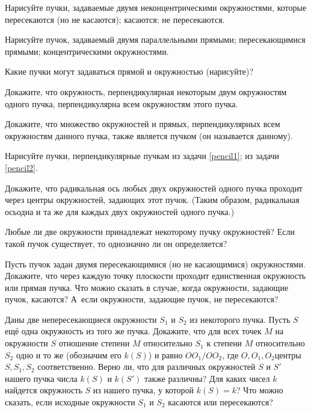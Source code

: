 \documentclass[a4paper,12pt]{article}
\begin{document}
\label{pencil1}
Нарисуйте пучки, задаваемые двумя неконцентрическими окружностями, которые\\
 пересекаются (но не касаются);
 касаются;
 не пересекаются.

\label{pencil2}
Нарисуйте пучок, задаваемый двумя
 параллельными прямыми;
 пересекающимися прямыми;
 концентрическими окружностями.

Какие пучки могут задаваться прямой и окружностью (нарисуйте)?

Докажите, что окружность, перпендикулярная некоторым двум окружностям одного пучка, перпендикулярна всем окружностям этого пучка.

Докажите, что множество окружностей и прямых, перпендикулярных всем окружностям данного пучка, также является пучком (он называется  данному).

Нарисуйте пучки, перпендикулярные пучкам
 из задачи \ref{pencil1};
 из задачи \ref{pencil2}.

Докажите, что радикальная ось любых двух окружностей одного пучка проходит через центры окружностей, задающих этот пучок. (Таким образом, радикальная ось\т одна и та же для каждых двух окружностей одного пучка.)

\vfill
{}
\newpage

Любые ли две окружности принадлежат некоторому пучку окружностей?
Если такой пучок существует, то однозначно ли он определяется?



Пусть пучок задан двумя пересекающимися (но не касающимися) окружностями. Докажите, что через каждую точку плоскости проходит единственная окружность или прямая пучка.
Что можно сказать в случае, когда окружности, задающие пучок, касаются?
А~если окружности, задающие пучок, не пересекаются?

Даны две непересекающиеся окружности $S_1$ и $S_2$ из некоторого пучка. Пусть $S$\т ещё одна окружность из того же пучка. Докажите, что для всех точек $M$ на окружности $S$ отношение степени $M$ относительно $S_1$ к степени $M$ относительно $S_2$ одно и то же (обозначим его $k(S)$) и равно $OO_1/OO_2$, где $O,O_1,O_2$\т центры $S,S_1,S_2$ соответственно.
Верно ли, что для различных окружностей $S$ и $S'$ нашего пучка числа $k(S)$ и $k(S')$ также различны?
Для каких чисел $k$ найдется окружность $S$ из нашего пучка, у которой $k(S)=k$?
Что можно сказать, если исходные окружности $S_1$ и $S_2$ касаются или пересекаются?
\end{document}
